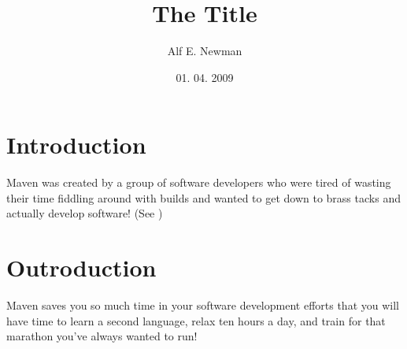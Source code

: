 \documentclass[11pt]{article}
\begin{document}
\title{The Title}
\author{Alf E. Newman}
\date{01. 04. 2009}
\maketitle

\newpage

\tableofcontents

\newpage

\section{Introduction}
Maven was created by a group of software developers who were tired of wasting their time fiddling around with builds and wanted to get down to brass tacks and actually develop software! (See \cite{Massol:2005fy})

\section{Outroduction}
Maven saves you so much time in your software development efforts that you will have time to learn a second language, relax ten hours a day, and train for that marathon you've always wanted to run!

\newpage 



  
\end{document}
